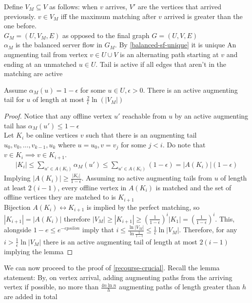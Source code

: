 Define $V_M\subseteq V$ as follows: when $v$ arrives, $V'$ are the vertices that arrived previously. $v\in V_M$ iff the maximum matching after $v$ arrived is greater than the one before.\\
$G_M=(U,V_M,E)$ as opposed to the final graph $G=(U,V,E)$\\
$\alpha_M$ is the balanced server flow in $G_M$. By \autoref{balanced-sf-unique} it is unique
An augmenting tail from vertex $v\in U\cup V$ is an alternating path starting at $v$ and ending at an unmatched $u\in U$. Tail is active if all edges that aren't in the matching are active

\begin{lemma}[Expansion]
	\label{recourse-expansion}
	Assume $\alpha_M(u)=1-\epsilon$ for some $u\in U,\epsilon>0$. There is an active augmenting tail for $u$ of length at most $\frac{2}{\epsilon}\ln(|V_M|)$
\end{lemma}
\begin{proof}
	Notice that any offline vertex $u'$ reachable from $u$ by an active augmenting tail has $\alpha_M(u')\leq 1-\epsilon$\\
	Let $K_i$ be online vertices $v$ such that there is an augmenting tail $u_0,v_0,\dots,v_{k-1},u_k$ where $u=u_0,v=v_j$ for some $j<i$. Do note that $v\in K_i\implies v\in K_{i+1}$.
	\begin{align*}
		|K_i|\leq\sum\limits_{u'\in A(K_i)}\alpha_M(u')\leq\sum\limits_{u'\in A(K_i)}(1-\epsilon)=|A(K_i)|(1-\epsilon)
	\end{align*}
	Implying $|A(K_i)|\geq\frac{|K_i|}{1-\epsilon}$.
	Assuming no active augmenting tails from $u$ of length at least $2(i-1)$, every offline vertex in $A(K_i)$ is matched and the set of offline vertices they are matched to is $K_{i+1}$\\
	Bijection $A(K_i)\leftrightarrow K_{i+1}$ is implied by the perfect matching, so $|K_{i+1}|=|A(K_i)|$ therefore $|V_M|\geq|K_{i+1}|\geq\left(\frac{1}{1-\epsilon}\right)^i|K_{1}|=\left(\frac{1}{1-\epsilon}\right)^i$. This, alongside $1-e\leq e^{-epsilon}$ imply that $i\leq\frac{\ln|V_M|}{\ln\frac{1}{1-\epsilon}}\leq\frac{1}{\epsilon}\ln|V_M|$.
	Therefore, for any $i>\frac{1}{\epsilon}\ln|V_M|$ there is an active augmenting tail of length at most $2(i-1)$ implying the lemma
\end{proof}

We can now proceed to the proof of \autoref{recourse-crucial}. Recall the lemma statement: By, on vertex arrival, adding augmenting paths from the arriving vertex if possible, no more than $\frac{4n\ln n}{h}$ augmenting paths of length greater than $h$ are added in total

